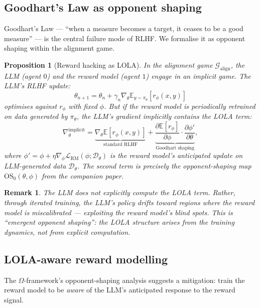 \documentclass[11pt,a4paper]{article}
\newtheorem{proposition}[theorem]{Proposition}
\newtheorem{remark}[theorem]{Remark}
\newcommand{\E}{\mathbb{E}}
\newcommand{\cL}{\mathcal{L}}
\newcommand{\cD}{\mathcal{D}}
\begin{document}
\subsection{Goodhart's Law as opponent shaping}

Goodhart's Law --- ``when a measure becomes a target, it ceases to be a good measure'' --- is the central failure mode of RLHF. We formalise it as opponent shaping within the alignment game.

\begin{proposition}[Reward hacking as LOLA]
\label{prop:goodhart-lola}
In the alignment game $\mathcal{G}_{\mathrm{align}}$, the LLM (agent $0$) and the reward model (agent $1$) engage in an implicit game. The LLM's RLHF update:
\begin{equation}
    \theta_{n+1} = \theta_n + \gamma_n \nabla_\theta \E_{y \sim \pi_\theta}[r_\phi(x, y)]
\end{equation}
optimises against $r_\phi$ with fixed $\phi$. But if the reward model is periodically retrained on data generated by $\pi_\theta$, the LLM's gradient implicitly contains the LOLA term:
\begin{equation}
\label{eq:goodhart-lola}
    \nabla_\theta^{\mathrm{implicit}} = \underbrace{\nabla_\theta \E[r_\phi(x, y)]}_{\text{standard RLHF}} + \underbrace{\frac{\partial \E[r_\phi]}{\partial \phi} \cdot \frac{\partial \phi'}{\partial \theta}}_{\text{Goodhart shaping}},
\end{equation}
where $\phi' = \phi + \eta \nabla_\phi \cL_{\mathrm{RM}}(\phi; \cD_\theta)$ is the reward model's anticipated update on LLM-generated data $\cD_\theta$. The second term is precisely the opponent-shaping map $\mathrm{OS}_0(\theta, \phi)$ from the companion paper.
\end{proposition}

\begin{remark}
The LLM does not explicitly compute the LOLA term. Rather, through iterated training, the LLM's policy drifts toward regions where the reward model is miscalibrated --- exploiting the reward model's blind spots. This is ``emergent opponent shaping'': the LOLA structure arises from the training dynamics, not from explicit computation.
\end{remark}

\subsection{LOLA-aware reward modelling}

The $\Omega$-framework's opponent-shaping analysis suggests a mitigation: train the reward model to be \emph{aware} of the LLM's anticipated response to the reward signal.
\end{document}
